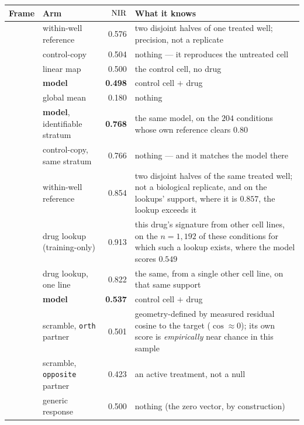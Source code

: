 \begin{table}[htbp]
\centering
\footnotesize
\begin{tabular}{llr>{\raggedright\arraybackslash}p{}}
\toprule
Frame & Arm & $\textrm{NIR}$ & What it knows \\
\midrule
{}
 & within-well reference & 0.576 & two disjoint halves of one treated well; precision, not a
replicate \\
 & control-copy & 0.504 & nothing --- it reproduces the untreated cell \\
 & linear map & 0.500 & the control cell, no drug \\
 & \textbf{model} & \textbf{0.498} & control cell $+$ drug \\
 & global mean & 0.180 & nothing \\
 & \textbf{model}, identifiable stratum & \textbf{0.768} & the same model, on the $204$ conditions
whose own reference clears $0.80$ \\
 & control-copy, same stratum & 0.766 & nothing --- and it matches the model there \\
\midrule
{}
 & within-well reference & 0.854 & two disjoint halves of the same treated well; not a
biological replicate, and on the lookups' support, where it is $0.857$, the lookup exceeds it \\
 & drug lookup (training-only) & 0.913 & this drug's signature from other cell lines, on the
$n = 1{,}192$ of these conditions for which such a lookup exists, where the model scores $0.549$ \\
 & drug lookup, one line & 0.822 & the same, from a single other cell line, on that same support \\
 & \textbf{model} & \textbf{0.537} & control cell $+$ drug \\
 & scramble, \texttt{orth} partner & 0.501 & geometry-defined by measured residual cosine to the
target ($\cos \approx 0$); its own score is \emph{empirically} near chance in this sample \\
 & scramble, \texttt{opposite} partner & 0.423 & an active treatment, not a null \\
 & generic response & 0.500 & nothing (the zero vector, by construction) \\

\end{tabular}
\end{table}
